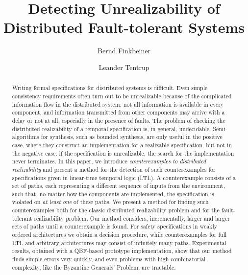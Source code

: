 \documentclass{LMCS}
\theoremstyle{plain}\newtheorem{theorem}[thm]{Theorem}
\theoremstyle{plain}\newtheorem{lemma}[thm]{Lemma}
\theoremstyle{plain}\newtheorem{proposition}[thm]{Proposition}
\theoremstyle{plain}\newtheorem{corollary}[thm]{Corollary}
\theoremstyle{definition}\newtheorem{definition}{Definition}[section]
\begin{document}
\title[Detecting Unrealizability of Distributed Fault-tolerant Systems]{Detecting Unrealizability of Distributed Fault-tolerant Systems}

\author[Finkbeiner and Tentrup]{Bernd Finkbeiner}	\address{Saarland University, 66123 Saarbr\"ucken}	  

\author[]{Leander Tentrup}	\address{\vspace{-18 pt}}	








\begin{abstract}
  \noindent Writing formal specifications for distributed systems is difficult.
Even simple consistency requirements often turn out to be unrealizable because of the complicated information flow in the distributed system: not all information is available in every component, and information transmitted from other components may arrive with a delay or not at all, especially in the presence of faults.
The problem of checking the distributed realizability of a temporal specification is, in general, undecidable.
Semi-algorithms for synthesis, such as bounded synthesis, are only useful in the positive case, where they construct an implementation for a realizable specification, but not in the negative case: if the specification is unrealizable, the search for the implementation never terminates.
In this paper, we introduce \emph{counterexamples to distributed realizability} and present a method for the detection of such counterexamples for specifications given in linear-time temporal logic (LTL).
A counterexample consists of a set of paths, each representing a different sequence of inputs from the environment, such that, no matter how the components are implemented, the specification is violated on \emph{at least one} of these paths.
We present a method for finding such counterexamples both for the classic distributed realizability problem and for the fault-tolerant realizability problem.
Our method considers, incrementally, larger and larger sets of paths until a counterexample is found.
For safety specifications in weakly ordered architectures we obtain a decision procedure, while counterexamples for full LTL and arbitrary architectures may consist of infinitely many paths.
Experimental results, obtained with a QBF-based prototype implementation, show that our method finds simple errors very quickly, and even problems with high combinatorial complexity, like the Byzantine Generals' Problem, are tractable.
\end{abstract}
\end{document}
